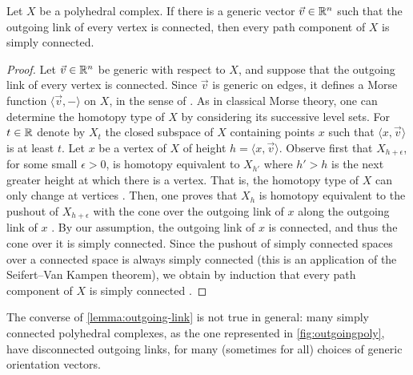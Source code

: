 
\begin{proposition}
    \label{lemma:outgoing-link}
    Let $X$ be a polyhedral complex.
    If there is a generic vector $\vec v \in \mathbb R^n$ such that the outgoing link of every vertex is connected, then every path component of $X$ is simply connected.
\end{proposition}

\begin{proof}
    Let $\vec v \in \mathbb R^n$ be generic with respect to $X$, and suppose that the outgoing link of every vertex is connected. 
    Since $\vec v$ is generic on edges, it defines a Morse function $\langle \vec v , -\rangle$ on $X$, in the sense of \cite[Def.~2.2]{bestvinaMorseTheoryFiniteness1997}.
    As in classical Morse theory, one can determine the homotopy type of $X$ by considering its successive level sets. 
    For $t \in \mathbb R$ denote by $X_t$ the closed subspace of $X$ containing points $x$ such that $\langle x, \vec v \rangle$ is at least $t$.
    Let $x$ be a vertex of $X$ of height $h=\langle x, \vec v \rangle$.
    Observe first that $X_{h+\epsilon}$, for some small $\epsilon>0$, is homotopy equivalent to $X_{h'}$ where $h' > h$ is the next greater height at which there is a vertex.
    That is, the homotopy type of $X$ can only change at vertices  \cite[Lem.~2.3]{bestvinaMorseTheoryFiniteness1997}.
    Then, one proves that $X_h$ is homotopy equivalent to the pushout of $X_{h+\epsilon}$ with the cone over the outgoing link of $x$ along the outgoing link of $x$  \cite[Lem.~2.5]{bestvinaMorseTheoryFiniteness1997}.
    By our assumption, the outgoing link of $x$ is connected, and thus the cone over it is simply connected. 
    Since the pushout of simply connected spaces over a connected space is always simply connected (this is an application of the Seifert--Van Kampen theorem), we obtain by induction that every path component of $X$ is simply connected \cite[Point (3) of Cor.~2.6]{bestvinaMorseTheoryFiniteness1997}.
\end{proof}

The converse of \cref{lemma:outgoing-link} is not true in general: many simply connected polyhedral complexes, as the one represented in \cref{fig:outgoingpoly}, have disconnected outgoing links, for many (sometimes for all) choices of generic orientation vectors. 

